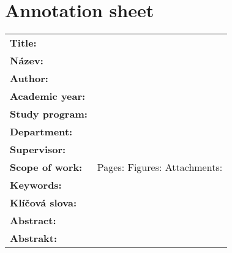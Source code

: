 \section*{Annotation sheet}
\renewcommand{\arraystretch}{1.2}
\begin{tabularx}{\textwidth}{l X}
	\textbf{Title:} & \ThesisTitle \\
	\textbf{Název:} & \ThesisTitleCZ \\
	\textbf{Author:} & \ThesisAuthor \\
	\textbf{Academic year:} & \\
	\textbf{Study program:} & \\
	\textbf{Department: } & \MECH \\
	\textbf{Supervisor:} & \ThesisSupervisor \\
	\textbf{Scope of work:} &
			Pages: \newline
			Figures: \newline
			Attachments: \\
	\textbf{Keywords:} &  \\
	\textbf{Klíčová slova:} &  \\
	\textbf{Abstract:} & \\
	\textbf{Abstrakt:} & \\
\end{tabularx}